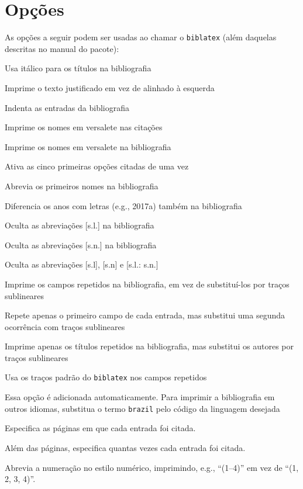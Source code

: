 \documentclass[a4paper]{article}
\begin{document}
\clearpage
\section{Opções}%
\label{sec:opções}

As opções a seguir podem ser usadas ao chamar o \texttt{biblatex} (além
daquelas descritas no manual do pacote):

\begin{description}[itemindent=-1em,leftmargin=3em]%
  \item [ittitles] Usa itálico para os títulos na bibliografia
  \item [justify] Imprime o texto justificado em vez de alinhado à esquerda
  \item [indent] Indenta as entradas da bibliografia
  \item [sccite] Imprime os nomes em versalete nas citações
  \item [scbib] Imprime os nomes em versalete na bibliografia
  \item [pretty] Ativa as cinco primeiras opções citadas de uma vez
  \item [giveninits] Abrevia os primeiros nomes na bibliografia
  \item [extrayear] Diferencia os anos com letras (e.g., 2017a)
    também na bibliografia
  \item [nosl] Oculta as abreviações [s.l.] na bibliografia
  \item [nosn] Oculta as abreviações [s.n.] na bibliografia
  \item [noslsn] Oculta as abreviações [s.l], [s.n] e [s.l.: s.n.]
  \item [repeatfields] Imprime os campos repetidos na bibliografia, em vez de
    subs\-ti\-tu\-í-los por traços sublineares
  \item [repeatfirstfields] Repete apenas o primeiro campo de cada entrada,
    mas substitui uma segunda ocorrência com traços sublineares
  \item [repeattitles] Imprime apenas os títulos repetidos na bibliografia,
    mas substitui os autores por traços sublineares
  \item [usedashes] Usa os traços padrão do \texttt{biblatex} nos campos
    repetidos
  \item [language=brazil] Essa opção é adicionada automaticamente. Para
    imprimir a bibliografia em outros idiomas, substitua o termo
    \texttt{brazil} pelo código da linguagem desejada
  \item [backref] Especifica as páginas em que cada entrada foi citada.
  \item [citecount] Além das páginas, especifica quantas vezes cada entrada
    foi citada.
  \item [comp] Abrevia a numeração no estilo numérico, imprimindo, e.g.,
    \enquote{(1--4)} em vez de \enquote{(1, 2, 3, 4)}.
\end{description}%
\end{document}
